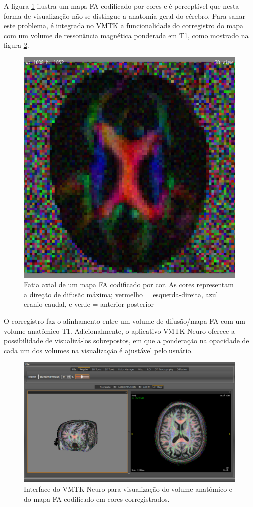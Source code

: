 \documentclass[
    12pt,                %
    oneside,            %
    a4paper,            %
    english,            %
    french,                %
    spanish,            %
    brazil                %
    ]{abntex2}
\begin{document}
A figura \ref{fig::MapaFA} ilustra um mapa FA codificado por cores e é perceptível que nesta forma de visualização não se distingue a anatomia geral do cérebro. Para sanar este problema, é integrada no VMTK a funcionalidade do corregistro do mapa com um volume de ressonância magnética ponderada em T1, como mostrado na figura \ref{corregistroFAT1}.

\begin{figure}[H]

    \centering

    \includegraphics[width=0.45\linewidth, angle=0]{figs/Exemplo_Trabalhos_Relacionados/MapaFA.png}
    \caption{Fatia axial de um mapa FA codificado por cor. As cores representam a direção de difusão máxima; vermelho = esquerda-direita, azul = cranio-caudal, e verde = anterior-posterior}
    \label{fig::MapaFA}
\end{figure}

O corregistro faz o alinhamento entre um volume de difusão/mapa FA com um volume anatômico T1. Adicionalmente, o aplicativo VMTK-Neuro oferece a possibilidade de visualizá-los sobrepostos, em que a ponderação na opacidade de cada um dos volumes na visualização é ajustável pelo usuário.

\begin{figure}[H]
\centering
\includegraphics[scale = 0.3]{figs/Exemplo_Trabalhos_Relacionados/corregistro.png}
\caption{Interface do VMTK-Neuro para visualização do volume anatômico e do mapa FA codificado em cores corregistrados.}
\label{corregistroFAT1}
\end{figure}
\end{document}
